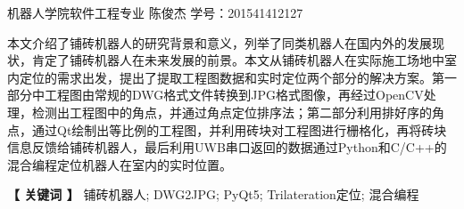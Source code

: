 \newpage


\centerline{\fangsong\bf{}}

\centerline{\fangsong\bf{}}


\vskip 1cm

\begin{center}
	\kaishu
	\hspace{2cm}机器人学院软件工程专业 \quad 陈俊杰 
	\vspace{5bp}
	\newline
	学号：201541412127
\end{center}

\vskip 10bp
{
\kaishu	
{} 
本文介绍了铺砖机器人的研究背景和意义，列举了同类机器人在国内外的发展现状，肯定了铺砖机器人在未来发展的前景。本文从铺砖机器人在实际施工场地中室内定位的需求出发，提出了提取工程图数据和实时定位两个部分的解决方案。第一部分中工程图由常规的DWG格式文件转换到JPG格式图像，再经过OpenCV处理，检测出工程图中的角点，并通过角点定位排序法；第二部分利用排好序的角点，通过Qt绘制出等比例的工程图，并利用砖块对工程图进行栅格化，再将砖块信息反馈给铺砖机器人，最后利用UWB串口返回的数据通过Python和C/C++的混合编程定位机器人在室内的实时位置。


\vskip 10bp

\hspace{5bp} {\textbf{【 关键词 】}} 
铺砖机器人; DWG2JPG; PyQt5; Trilateration定位; 混合编程
}
